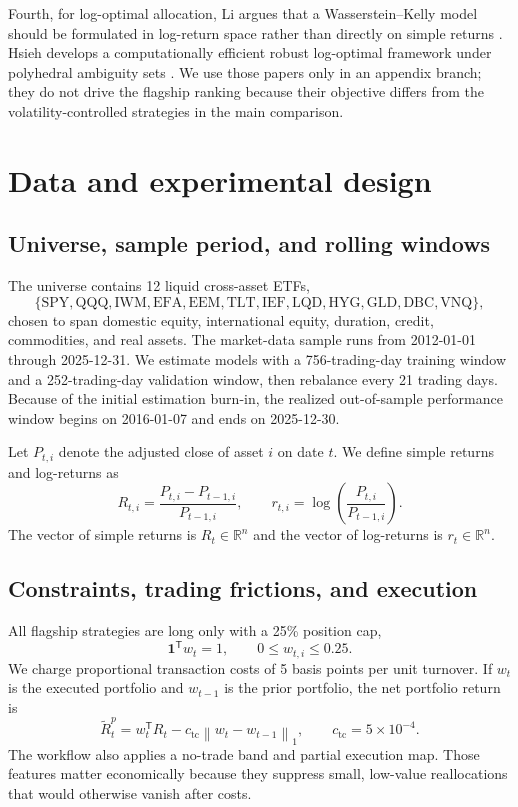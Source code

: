 \documentclass[11pt]{article}
\newcommand{\R}{\mathbb{R}}
\newcommand{\ones}{\mathbf{1}}
\newcommand{\norm}[1]{\left\lVert #1 \right\rVert}
\newcommand{\transpose}{\mathsf{T}}
\begin{document}
Fourth, for log-optimal allocation, Li argues that a Wasserstein--Kelly model should be formulated in log-return space rather than directly on simple returns \cite{Li2023}. Hsieh develops a computationally efficient robust log-optimal framework under polyhedral ambiguity sets \cite{Hsieh2023}. We use those papers only in an appendix branch; they do not drive the flagship ranking because their objective differs from the volatility-controlled strategies in the main comparison.

\section{Data and experimental design}

\subsection{Universe, sample period, and rolling windows}

The universe contains 12 liquid cross-asset ETFs,
\[
\{\mathrm{SPY},\mathrm{QQQ},\mathrm{IWM},\mathrm{EFA},\mathrm{EEM},\mathrm{TLT},\mathrm{IEF},\mathrm{LQD},\mathrm{HYG},\mathrm{GLD},\mathrm{DBC},\mathrm{VNQ}\},
\]
chosen to span domestic equity, international equity, duration, credit, commodities, and real assets. The market-data sample runs from 2012-01-01 through 2025-12-31. We estimate models with a 756-trading-day training window and a 252-trading-day validation window, then rebalance every 21 trading days. Because of the initial estimation burn-in, the realized out-of-sample performance window begins on 2016-01-07 and ends on 2025-12-30.

Let $P_{t,i}$ denote the adjusted close of asset $i$ on date $t$. We define simple returns and log-returns as
\begin{equation}
R_{t,i}= \frac{P_{t,i}-P_{t-1,i}}{P_{t-1,i}},
\qquad
r_{t,i}= \log\!\left(\frac{P_{t,i}}{P_{t-1,i}}\right).
\end{equation}
The vector of simple returns is $R_t\in\R^n$ and the vector of log-returns is $r_t\in\R^n$.

\subsection{Constraints, trading frictions, and execution}

All flagship strategies are long only with a 25\% position cap,
\begin{equation}
\ones^\transpose w_t=1,
\qquad
0\le w_{t,i}\le 0.25.
\end{equation}
We charge proportional transaction costs of 5 basis points per unit turnover. If $w_t$ is the executed portfolio and $w_{t-1}$ is the prior portfolio, the net portfolio return is
\begin{equation}
\widetilde R_t^p = w_t^\transpose R_t - c_{\mathrm{tc}}\norm{w_t-w_{t-1}}_1,
\qquad c_{\mathrm{tc}}=5\times 10^{-4}.
\end{equation}
The workflow also applies a no-trade band and partial execution map. Those features matter economically because they suppress small, low-value reallocations that would otherwise vanish after costs.
\end{document}
